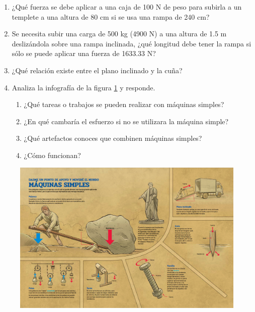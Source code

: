 \documentclass[11pt]{book}
\begin{document}
\begin{boxK}
    \begin{enumerate}
        \item ¿Qué fuerza se debe aplicar a una caja de 100 N de peso para subirla a
              un templete a una altura de 80 cm si se usa una rampa de 240 cm?
        \item Se necesita subir una carga de 500 kg (4900 N) a una altura de 1.5 m
              deslizándola sobre una rampa inclinada, ¿qué longitud debe tener la rampa si
              sólo se puede aplicar una fuerza de 1633.33 N?
        \item ¿Qué relación existe entre el plano inclinado y la cuña?
        \item Analiza la infografía de la figura \ref{fig:SINFI2SB_1E16_U1_S4_b_info} y responde.
              \begin{enumerate}
                  \item ¿Qué tareas o trabajos se pueden realizar con máquinas simples?
                  \item ¿En qué cambar\'ia el esfuerzo si no se utilizara la máquina simple?
                  \item ¿Qué artefactos conoces que combinen máquinas simples?
                  \item ¿Cómo funcionan?
              \end{enumerate}
    \end{enumerate}
\end{boxK}

\newpage

\begin{landscape}
    \thispagestyle{empty}
    \begin{figure}[H]
        \centering
        \includegraphics[width=\linewidth]{SINFI2SB_1E16_U1_S4_b_info.png}
        \label{fig:SINFI2SB_1E16_U1_S4_b_info}
    \end{figure}
\end{landscape}
\end{document}
